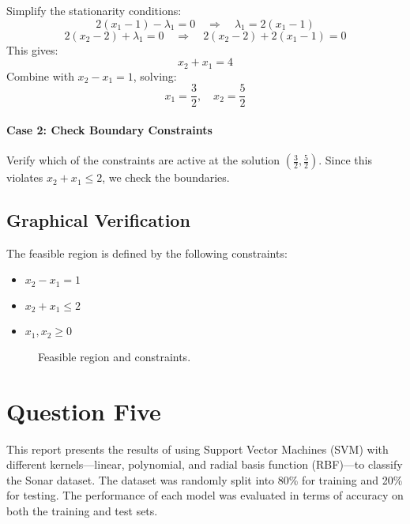 \documentclass[a4paper, 11pt]{article}
\begin{document}
	Simplify the stationarity conditions:
	\[
	2(x_1 - 1) - \lambda_1 = 0 \quad \Rightarrow \quad \lambda_1 = 2(x_1 - 1)
	\]
	\[
	2(x_2 - 2) + \lambda_1 = 0 \quad \Rightarrow \quad 2(x_2 - 2) + 2(x_1 - 1) = 0
	\]
	This gives:
	\[
	x_2 + x_1 = 4
	\]
	Combine with $x_2 - x_1 = 1$, solving:
	\[
	x_1 = \frac{3}{2}, \quad x_2 = \frac{5}{2}
	\]
	
	\paragraph{Case 2: Check Boundary Constraints}
	Verify which of the constraints are active at the solution $(\frac{3}{2}, \frac{5}{2})$. Since this violates $x_2 + x_1 \le 2$, we check the boundaries.
	
	\subsection*{Graphical Verification}
	The feasible region is defined by the following constraints:
	\begin{itemize}
		\item $x_2 - x_1 = 1$
		\item $x_2 + x_1 \le 2$
		\item $x_1, x_2 \ge 0$
	\end{itemize}
	
	\begin{figure}[h]
		\centering
		\caption{Feasible region and constraints.}
	\end{figure}
	
	\newpage
	\section*{Question Five}
	This report presents the results of using Support Vector Machines (SVM) with different kernels—linear, polynomial, and radial basis function (RBF)—to classify the Sonar dataset. The dataset was randomly split into 80\% for training and 20\% for testing. The performance of each model was evaluated in terms of accuracy on both the training and test sets.
	
\end{document}

